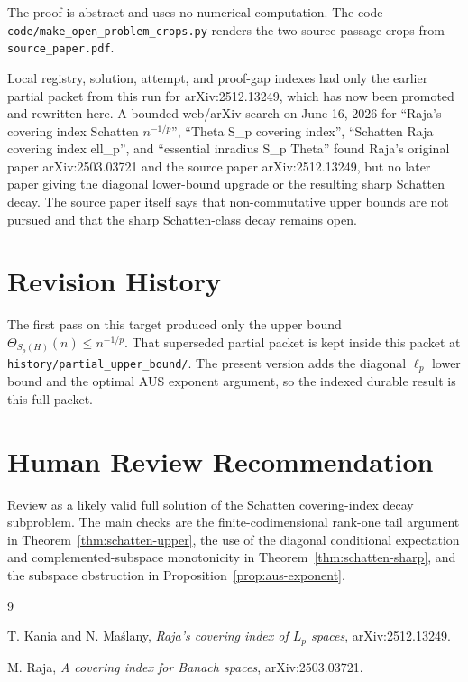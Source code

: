 \documentclass[11pt]{article}
\begin{document}
The proof is abstract and uses no numerical computation.  The code
\texttt{code/make\_open\_problem\_crops.py} renders the two source-passage
crops from \texttt{source\_paper.pdf}.

Local registry, solution, attempt, and proof-gap indexes had only the earlier
partial packet from this run for arXiv:2512.13249, which has now been promoted
and rewritten here.  A bounded web/arXiv search on June 16, 2026 for
``Raja's covering index Schatten \(n^{-1/p}\)'', ``Theta S\_p covering
index'', ``Schatten Raja covering index ell\_p'', and ``essential inradius
S\_p Theta'' found Raja's original paper arXiv:2503.03721 and the source
paper arXiv:2512.13249, but no later paper giving the diagonal lower-bound
upgrade or the resulting sharp Schatten decay.  The source paper itself says
that non-commutative upper bounds are not pursued and that the sharp
Schatten-class decay remains open.

\section*{Revision History}

The first pass on this target produced only the upper bound
\(\Theta_{S_p(H)}(n)\le n^{-1/p}\).  That superseded partial packet is kept
inside this packet at \texttt{history/partial\_upper\_bound/}.  The present
version adds the diagonal \(\ell_p\) lower bound and the optimal AUS exponent
argument, so the indexed durable result is this full packet.

\section*{Human Review Recommendation}

Review as a likely valid full solution of the Schatten covering-index decay
subproblem.  The main checks are the finite-codimensional rank-one tail
argument in Theorem~\ref{thm:schatten-upper}, the use of the diagonal
conditional expectation and complemented-subspace monotonicity in
Theorem~\ref{thm:schatten-sharp}, and the subspace obstruction in
Proposition~\ref{prop:aus-exponent}.

\begin{thebibliography}{9}

T. Kania and N. Ma\'slany,
\emph{Raja's covering index of \(L_p\) spaces}, arXiv:2512.13249.

M. Raja,
\emph{A covering index for Banach spaces}, arXiv:2503.03721.

\end{thebibliography}
\end{document}
